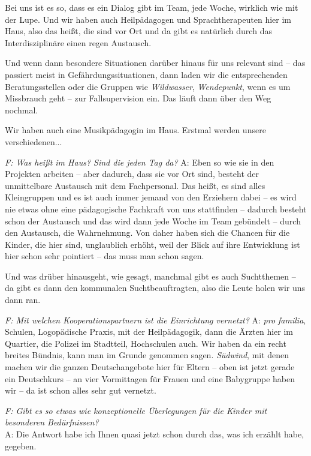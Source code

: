 \begin{linenumbers*}
Bei uns ist es so, dass es ein Dialog gibt im Team, jede Woche, wirklich wie mit der Lupe. 
Und wir haben auch Heilpädagogen und Sprachtherapeuten hier im Haus, also das heißt, die sind vor Ort und da gibt es natürlich durch das Interdisziplinäre einen regen Austausch. 

Und wenn dann besondere Situationen darüber hinaus für uns relevant sind -- das passiert meist in Gefährdungssituationen, dann laden wir die entsprechenden Beratungsstellen oder die Gruppen wie \emph{Wildwasser}, \emph{Wendepunkt}, wenn es um Missbrauch geht -- zur Fallsupervision ein. Das läuft dann über den Weg nochmal. 

Wir haben auch eine Musikpädagogin im Haus. Erstmal werden unsere verschiedenen...

\emph{F: Was heißt im Haus? Sind die jeden Tag da?}
A: Eben so wie sie in den Projekten arbeiten -- aber dadurch, dass sie vor Ort sind, besteht der unmittelbare Austausch mit dem Fachpersonal.
Das heißt, es sind alles Kleingruppen und es ist auch immer jemand von den Erziehern dabei -- es wird nie etwas ohne eine pädagogische Fachkraft von uns stattfinden -- dadurch besteht schon der Austausch und das wird dann jede Woche im Team gebündelt -- durch den Austausch, die Wahrnehmung. Von daher haben sich die Chancen für die Kinder, die hier sind, unglaublich erhöht, weil der Blick auf ihre Entwicklung ist hier schon sehr pointiert -- das muss man schon sagen. 

Und was drüber hinausgeht, wie gesagt, manchmal gibt es auch Suchtthemen -- da gibt es dann den kommunalen Suchtbeauftragten, also die Leute holen wir uns dann ran. 

\emph{F: Mit welchen Kooperationspartnern ist die Einrichtung vernetzt?}
A: \emph{pro familia}, Schulen, Logopädische Praxis, mit der Heilpädagogik, dann die Ärzten hier im Quartier, die Polizei im Stadtteil, Hochschulen auch. Wir haben da ein recht breites Bündnis, kann man im Grunde genommen sagen.
\emph{Südwind},
mit denen machen wir die ganzen Deutschangebote hier für Eltern -- oben ist jetzt gerade ein Deutschkurs -- an vier Vormittagen für Frauen und eine Babygruppe haben wir -- da ist schon alles sehr gut vernetzt. 

\emph{F: Gibt es so etwas wie konzeptionelle Überlegungen für die Kinder mit besonderen Bedürfnissen?}\\
A: Die Antwort habe ich Ihnen quasi jetzt schon durch das, was ich erzählt habe, gegeben.\\


\end{linenumbers*}

